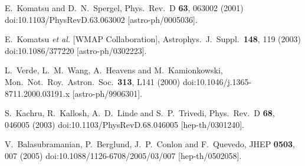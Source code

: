 \documentclass[a4paper,11pt]{article}
\begin{document}
\begin{thebibliography}{99}
%

  E.~Komatsu and D.~N.~Spergel,
  Phys.\ Rev.\ D {\bf 63}, 063002 (2001)
  doi:10.1103/PhysRevD.63.063002
  [astro-ph/0005036].


  E.~Komatsu {\it et al.} [WMAP Collaboration],
  Astrophys.\ J.\ Suppl.\  {\bf 148}, 119 (2003)
  doi:10.1086/377220
  [astro-ph/0302223].


  L.~Verde, L.~M.~Wang, A.~Heavens and M.~Kamionkowski,
  Mon.\ Not.\ Roy.\ Astron.\ Soc.\  {\bf 313}, L141 (2000)
  doi:10.1046/j.1365-8711.2000.03191.x
  [astro-ph/9906301].


  S.~Kachru, R.~Kallosh, A.~D.~Linde and S.~P.~Trivedi,
  Phys.\ Rev.\ D {\bf 68}, 046005 (2003)
  doi:10.1103/PhysRevD.68.046005
  [hep-th/0301240].


  V.~Balasubramanian, P.~Berglund, J.~P.~Conlon and F.~Quevedo,
  JHEP {\bf 0503}, 007 (2005)
  doi:10.1088/1126-6708/2005/03/007
  [hep-th/0502058].


\end{thebibliography}
\end{document}
